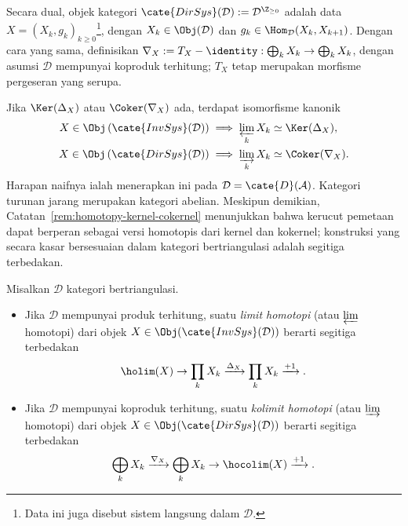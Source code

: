Secara dual, objek kategori
$\cate{DirSys}(\mathcal{D}):=\mathcal{D}^{\Z_{\geq0}}$ adalah data
$X=(X_k,g_k)_{k\geq0}$\footnote{Data ini juga disebut sistem langsung dalam
$\mathcal{D}$.}, dengan $X_k\in\Obj(\mathcal{D})$ dan
$g_k\in\Hom_{\mathcal{D}}(X_k,X_{k+1})$. Dengan cara yang sama, definisikan
$\nabla_X:=T_X-\identity:\bigoplus_kX_k\to\bigoplus_kX_k$, dengan asumsi
$\mathcal{D}$ mempunyai koproduk terhitung; $T_X$ tetap merupakan morfisme
pergeseran yang serupa.

Jika $\Ker(\Delta_X)$ atau $\Coker(\nabla_X)$ ada, terdapat isomorfisme
kanonik
\begin{align*}
	X \in \Obj\left( \cate{InvSys}(\mathcal{D}) \right) & \implies \varprojlim_k X_k \simeq \Ker(\Delta_X), \\
	X \in \Obj\left( \cate{DirSys}(\mathcal{D}) \right) & \implies \varinjlim_k X_k \simeq \Coker(\nabla_X).
\end{align*}
Harapan naifnya ialah menerapkan ini pada $\mathcal{D}=\cate{D}(\mathcal{A})$.
Kategori turunan jarang merupakan kategori abelian. Meskipun demikian,
Catatan~\ref{rem:homotopy-kernel-cokernel} menunjukkan bahwa kerucut pemetaan
dapat berperan sebagai versi homotopis dari kernel dan kokernel; konstruksi yang
secara kasar bersesuaian dalam kategori bertriangulasi adalah segitiga
terbedakan.

\begin{definisi}\label{def:holim}
	Misalkan $\mathcal{D}$ kategori bertriangulasi.
	\begin{itemize}
		\item Jika $\mathcal{D}$ mempunyai produk terhitung, suatu \emph{limit
		homotopi} (atau $\varprojlim$ homotopi) dari objek
		$X\in\Obj(\cate{InvSys}(\mathcal{D}))$ berarti segitiga terbedakan
		\[ \holim(X) \to \prod_k X_k \xrightarrow{\Delta_X} \prod_k X_k \xrightarrow{+1} . \]
		\item Jika $\mathcal{D}$ mempunyai koproduk terhitung, suatu
		\emph{kolimit homotopi} (atau $\varinjlim$ homotopi) dari objek
		$X\in\Obj(\cate{DirSys}(\mathcal{D}))$ berarti segitiga terbedakan
		\[ \bigoplus_k X_k \xrightarrow{\nabla_X} \bigoplus_k X_k \to \hocolim(X) \xrightarrow{+1} . \]
	\end{itemize}
\end{definisi}

